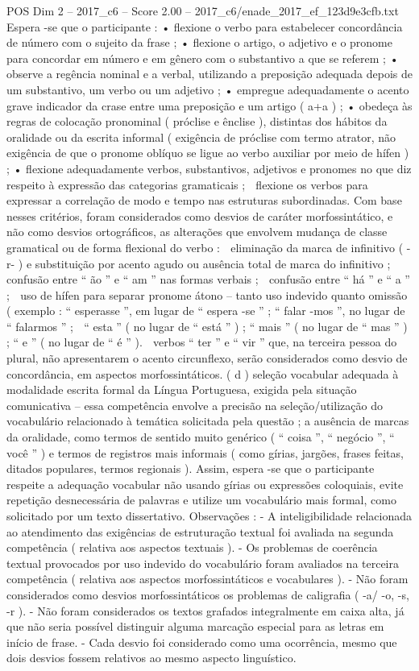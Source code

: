 \begin{textsample}{POS Dim 2 – 2017\_c6 – Score 2.00 – 2017\_c6/enade\_2017\_ef\_123d9e3cfb.txt}
Espera -se que o participante : • flexione o verbo para estabelecer concordância de número com o sujeito da frase ; • flexione o artigo, o adjetivo e o pronome para concordar em número e em gênero com o substantivo a que se referem ; • observe a regência nominal e a verbal, utilizando a preposição adequada depois de um substantivo, um verbo ou um adjetivo ; • empregue adequadamente o acento grave indicador da crase entre uma preposição e um artigo ( a+a ) ; • obedeça às regras de colocação pronominal ( próclise e ênclise ), distintas dos hábitos da oralidade ou da escrita informal ( exigência de próclise com termo atrator, não exigência de que o pronome oblíquo se ligue ao verbo auxiliar por meio de hífen ) ; • flexione adequadamente verbos, substantivos, adjetivos e pronomes no que diz respeito à expressão das categorias gramaticais ;  flexione os verbos para expressar a correlação de modo e tempo nas estruturas subordinadas.
Com base nesses critérios, foram considerados como desvios de caráter morfossintático, e não como desvios ortográficos, as alterações que envolvem mudança de classe gramatical ou de forma flexional do verbo :  eliminação da marca de infinitivo ( -r- ) e substituição por acento agudo ou ausência total de marca do infinitivo ;  confusão entre “ ão ” e “ am ” nas formas verbais ;  confusão entre “ há ” e “ a ” ;  uso de hífen para separar pronome átono – tanto uso indevido quanto omissão ( exemplo : “ esperasse ”, em lugar de “ espera -se ” ; “ falar -mos ”, no lugar de “ falarmos ” ;  “ esta ” ( no lugar de “ está ” ) ; “ mais ” ( no lugar de “ mas ” ) ; “ e ” ( no lugar de “ é ” ).  verbos “ ter ” e “ vir ” que, na terceira pessoa do plural, não apresentarem o acento circunflexo, serão considerados como desvio de concordância, em aspectos morfossintáticos. ( d ) seleção vocabular adequada à modalidade escrita formal da Língua Portuguesa, exigida pela situação comunicativa – essa competência envolve a precisão na seleção/utilização do vocabulário relacionado à temática solicitada pela questão ; a ausência de marcas da oralidade, como termos de sentido muito genérico ( “ coisa ”, “ negócio ”, “ você ” ) e termos de registros mais informais ( como gírias, jargões, frases feitas, ditados populares, termos regionais ).
Assim, espera -se que o participante respeite a adequação vocabular não usando gírias ou expressões coloquiais, evite repetição desnecessária de palavras e utilize um vocabulário mais formal, como solicitado por um texto dissertativo.
Observações : - A inteligibilidade relacionada ao atendimento das exigências de estruturação textual foi avaliada na segunda competência ( relativa aos aspectos textuais ). - Os problemas de coerência textual provocados por uso indevido do vocabulário foram avaliados na terceira competência ( relativa aos aspectos morfossintáticos e vocabulares ). - Não foram considerados como desvios morfossintáticos os problemas de caligrafia ( -a/ -o, -s, -r ). - Não foram considerados os textos grafados integralmente em caixa alta, já que não seria possível distinguir alguma marcação especial para as letras em início de frase. - Cada desvio foi considerado como uma ocorrência, mesmo que dois desvios fossem relativos ao mesmo aspecto linguístico.

\end{textsample}
